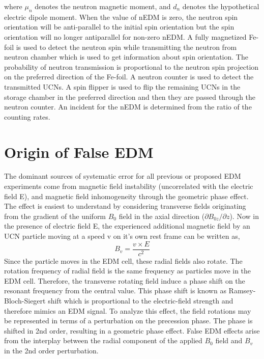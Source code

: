 where $\mu_n$ denotes the neutron magnetic moment, and $d_n$ denotes the hypothetical electric dipole moment. When the value of nEDM is zero, the neutron spin orientation will be anti-parallel to the initial spin orientation but the spin orientation will no longer antiparallel for non-zero nEDM. A fully magnetized Fe-foil is used to detect the neutron spin while transmitting the neutron from neutron chamber which is used to get information about spin orientation. The probability of neutron transmission is proportional to the neutron spin projection on the preferred direction of the Fe-foil. A neutron counter is used to detect the transmitted UCNs. A spin flipper is used to flip the remaining UCNs in the storage chamber in the preferred direction and then they are passed through the neutron counter. An incident for the nEDM is determined from the ratio of the counting rates.

\section{Origin of False EDM}
The dominant sources of systematic error for all previous or proposed EDM experiments come from magnetic field instability (uncorrelated with the electric field E), and magnetic field inhomogeneity through the geometric phase effect\cite{PhysRevA.70.032102}.  The effect is easiest to understand by considering transverse fields originating from the gradient of the uniform $B_0$  field in the axial direction ($\partial B_{0z}/{\partial  z}$).  Now in the presence of electric field E, the experienced additional magnetic field by an UCN particle moving at a speed v on it’s own rest frame can be written as,
\begin{equation}
  B_v = \frac{v\times E}{c^2}
  \label{equation:phase effect}
\end{equation}
 Since the particle moves in the EDM cell, these radial fields also rotate. The rotation frequency of radial field is the same frequency as particles move in the EDM cell.  Therefore, the transverse rotating field induce a phase shift on the resonant frequency from the central value.  This phase shift is known as Ramsey-Bloch-Siegert shift which is proportional to the electric-field strength and therefore mimics an EDM signal. 
 To analyze this effect, the field rotations may be represented in terms of a perturbation on the precession phase. The phase is shifted in 2nd order, resulting in a geometric phase effect.  False EDM effects arise from the interplay between the radial component of the applied $B_0$  field and $B_v$ in the 2nd order perturbation.

